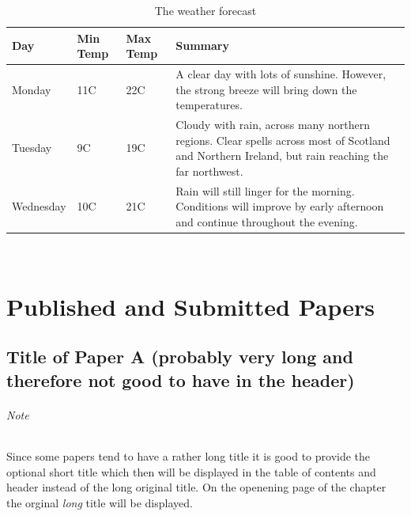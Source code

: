 \documentclass[11pt,openright]{book} %
\begin{document}
\lipsum[4]

\begin{table}[!ht]
 \caption{The weather forecast}
  \centering
   \begin{tabular}{ | l | l | l | p{5cm} |}
    \hline
    Day & Min Temp & Max Temp & Summary \\ \hline
    Monday & 11C & 22C & A clear day with lots of sunshine.
    However, the strong breeze will bring down the temperatures. \\ \hline
    Tuesday & 9C & 19C & Cloudy with rain, across many northern regions. Clear spells
    across most of Scotland and Northern Ireland,
    but rain reaching the far northwest. \\ \hline
    Wednesday & 10C & 21C & Rain will still linger for the morning.
    Conditions will improve by early afternoon and continue
    throughout the evening. \\
    \hline
    \end{tabular}
\end{table}

~\nocite{*}

\cleardoublepage
{}



\appendix
\renewcommand{\appendixname}{Paper} %

\part{Published and Submitted Papers}  %
\label{part:papers}


\chapter[Short Title of Paper A]{Title of Paper A (probably very long and therefore not good to have in the header)}
\label{paper-a}

\paragraph{Note}
Since some papers tend to have a rather long title it is good to provide the optional short title which then will be displayed in the table of contents and header instead of the long original title.
On the openening page of the chapter the orginal \emph{long} title will be displayed.\bigskip
\end{document}
